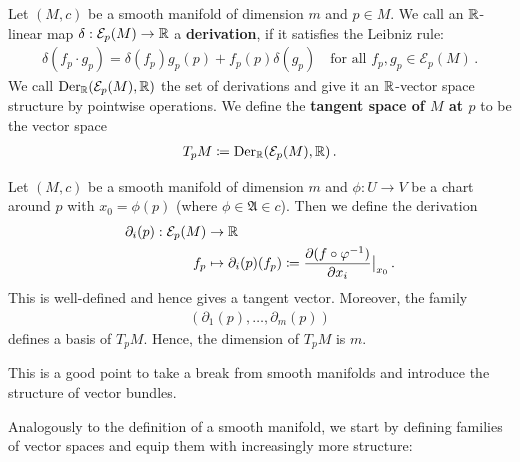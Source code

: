 \begin{definition}
	Let $(M,c)$ be a smooth manifold of dimension $m$ and $p\in M$. We call an $\mathbb{R}$-linear map $\delta:\mathcal{E}_p(M)\to \mathbb{R}$ a \textbf{derivation}, if it satisfies the Leibniz rule:
	\begin{align*}
		\delta(f_p\cdot g_p)=\delta(f_p)g_p(p)+f_p(p)\delta(g_p) \quad \text{for all }f_p,g_p\in \mathcal{E}_p(M) \, .
	\end{align*}
	We call $\mathrm{Der}_{\mathbb{R}}(\mathcal{E}_p(M),\mathbb{R})$ the set of derivations and give it an $\mathbb{R}$-vector space structure by pointwise operations. We define the \textbf{tangent space of $M$ at $p$} to be the vector space
	\begin{align*}
		T_pM \coloneq \mathrm{Der}_{\mathbb{R}}(\mathcal{E}_p(M),\mathbb{R}) \, .
	\end{align*}
\end{definition}
\begin{corollary}
	Let $(M,c)$ be a smooth manifold of dimension $m$ and $\phi:U\to V$ be a chart around $p$ with $x_0=\phi(p)$ (where $\phi \in \mathfrak{A}\in c$). Then we define the derivation
	\begin{align*}
		\partial_i(p) : \mathcal{E}_p(M) &\to \mathbb{R} \\
		f_p & \mapsto \partial_i(p)(f_p)\coloneq \frac{\partial(f\circ \varphi^{-1})}{\partial x_i}\big|_{x_0}\,.
	\end{align*}This is well-defined and hence gives a tangent vector. Moreover, the family
	\begin{align*}
		\left(\partial_1(p),\dots,\partial_m(p)\right)
	\end{align*} defines a basis of $T_pM$. Hence, the dimension of $T_pM$ is $m$.
\end{corollary}

This is a good point to take a break from smooth manifolds and introduce the structure of vector bundles. 







Analogously to the definition of a smooth manifold, we start by defining families of vector spaces and equip them with increasingly more structure:


